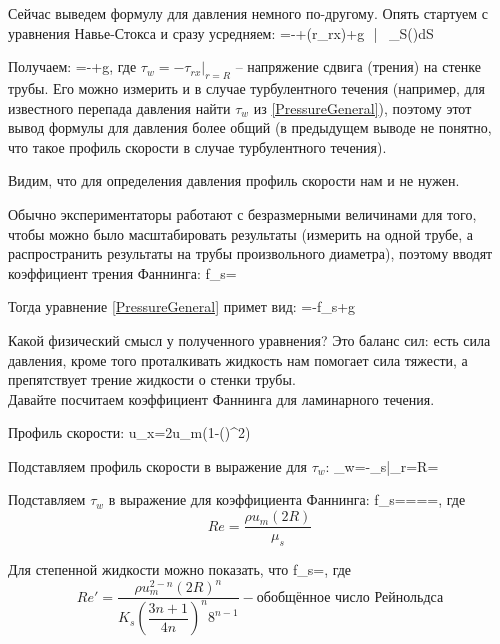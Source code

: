 \documentclass[main.tex]{subfiles}
\begin{document}
Сейчас выведем формулу для давления немного по-другому.
Опять стартуем с уравнения Навье-Стокса и сразу усредняем:
=-+\left(r\tau_{rx}\right)+\rho g \sin{\theta}\,\,\bigg|\,\,\,\,\,\int\limits_S(\cdot)dS
\eeq

Получаем:
\beq\label{PressureGeneral}
=-+\overline{\rho}g\sin{\theta},
\eeq
где $\tau_w=-\tau_{rx}|_{r=R}$ -- напряжение сдвига (трения) на стенке трубы.
Его можно измерить и в случае турбулентного течения (например, для известного перепада давления найти $\tau_w$ из \eqref{PressureGeneral}), поэтому этот вывод формулы для давления более общий (в предыдущем выводе не понятно, что такое профиль скорости в случае турбулентного течения).

Видим, что для определения давления профиль скорости нам и не нужен.

Обычно экспериментаторы работают с безразмерными величинами для того, чтобы можно было масштабировать результаты (измерить на одной трубе, а распространить результаты на трубы произвольного диаметра), поэтому вводят коэффициент трения Фаннинга:
\beq
f_s=
\eeq

Тогда уравнение \eqref{PressureGeneral} примет вид:
\beq
{}=-f_s+\rho g\sin{\theta}
\eeq

Какой физический смысл у полученного уравнения?
Это баланс сил: есть сила давления, кроме того проталкивать жидкость нам помогает сила тяжести, а препятствует трение жидкости о стенки трубы.
\\

Давайте посчитаем коэффициент Фаннинга для ламинарного течения.

Профиль скорости:
\beq
u_x=2u_m\left(1-\left(\right)^2\right)
\eeq

Подставляем профиль скорости в выражение для $\tau_w$:
\beq
\tau_w=-\mu_s\bigg|_{r=R}=
\eeq

Подставляем $\tau_w$ в выражение для коэффициента Фаннинга:
\beq
f_s====,
\eeq
где
$$Re=\frac{\rho u_m(2R)}{\mu_s}$$

Для степенной жидкости можно показать, что
\beq
f_s=,
\eeq
где
$$Re'=\dfrac{\rho u_m^{2-n}(2R)^n}{K_s\left(\dfrac{3n+1}{4n}\right)^n8^{n-1}}-\text{обобщённое число Рейнольдса}$$
\end{document}

